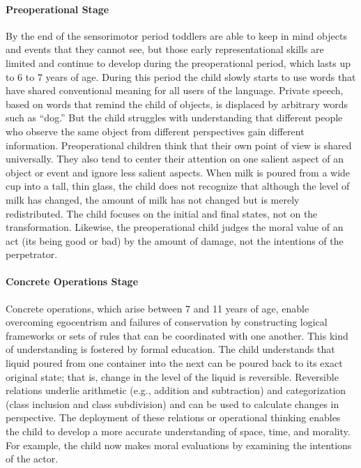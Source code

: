 \paragraph{Preoperational Stage}
By the end of the sensorimotor period toddlers are able to keep in mind objects
and events that they cannot see, but those early representational skills are
limited and continue to develop during the preoperational period, which lasts
up to 6 to 7 years of age. During this period the child slowly starts to use
words that have shared conventional meaning for all users of the language.
Private speech, based on words that remind the child of objects, is displaced
by arbitrary words such as “dog.” But the child struggles with understanding
that different people who observe the same object from different perspectives
gain different information.
Preoperational children think that their own point of view is shared
universally. They also tend to center their attention on one salient aspect of
an object or event and ignore less salient aspects. When milk is poured from a
wide cup into a tall, thin glass, the child does not recognize that although
the level of milk has changed, the amount of milk has not changed but is merely
redistributed. The child focuses on the initial and final states, not on the
transformation. Likewise, the preoperational child judges the moral value of an
act (its being good or bad) by the amount of damage, not the intentions of the
perpetrator. \cite{Feldman3}

\paragraph{Concrete Operations Stage}
Concrete operations, which arise between 7 and 11 years of age, enable
overcoming egocentrism and failures of conservation by constructing logical
frameworks or sets of rules that can be coordinated with one another. This kind
of understanding is fostered by formal education. The child understands that
liquid poured from one container into the next can be poured back to its exact
original state; that is, change in the level of the liquid is reversible.
Reversible relations underlie arithmetic (e.g., addition and subtraction) and
categorization (class inclusion and class subdivision) and can be used to
calculate changes in perspective. The deployment of these relations or
operational thinking enables the child to develop a more accurate understanding
of space, time, and morality. For example, the child now makes moral
evaluations by examining the intentions of the actor. \cite{Feldman3}


